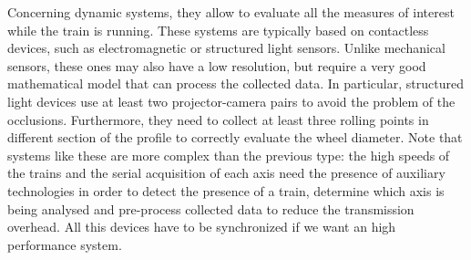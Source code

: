 Concerning dynamic systems, they allow to evaluate all the measures of interest while the train is running. These systems are typically based on contactless devices, such as electromagnetic or structured light sensors. Unlike mechanical sensors, these ones may also have a low resolution, but require a very good mathematical model that can process the collected data. In particular, structured light devices use at least two projector-camera pairs to avoid the problem of the occlusions. Furthermore, they need to collect at least three rolling points in different section of the profile to correctly evaluate the wheel diameter\cite{wpms-giuseppe}. Note that systems like these are more complex than the previous type: the high speeds of the trains and the serial acquisition of each axis need the presence of auxiliary technologies in order to detect the presence of a train, determine which axis is being analysed and pre-process collected data to reduce the transmission overhead. All this devices have to be synchronized if we want an high performance system. 
